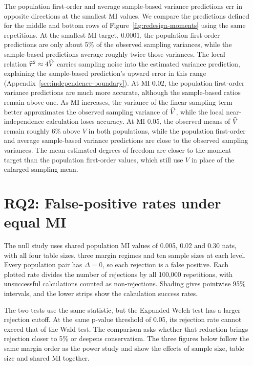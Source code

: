 The population first-order and average sample-based variance predictions
err in opposite directions at the smallest MI values. We compare the
predictions defined for the middle and bottom rows of
Figure~\ref{fig:redesign-moments} using the same repetitions. At the smallest MI target,
0.0001, the population first-order predictions are only about
5\% of the observed sampling variances, while the sample-based predictions
average roughly twice those variances. The local relation
\(\widehat\tau^2\approx4\widehat V\) carries sampling noise into the estimated
variance prediction, explaining the sample-based prediction's upward error
in this range
(Appendix~\ref{sec:independence-boundary}). At MI 0.02, the population
first-order variance predictions are much more accurate, although the
sample-based ratios remain above one. As MI increases, the variance of the
linear sampling term better approximates the observed sampling variance of
\(\widehat V\), while the local near-independence calculation loses accuracy.
At MI 0.05, the observed means of \(\widehat V\) remain roughly 6\% above \(V\)
in both populations, while the population first-order and average
sample-based variance predictions are close to the observed sampling
variances. The mean estimated degrees of
freedom are closer to the moment target than the population first-order
values, which still use \(V\) in place of the enlarged sampling mean.

\section{RQ2: False-positive rates under equal MI}
\label{sec:null-rejection-patterns}

The null study uses shared population MI values of 0.005, 0.02 and 0.30
nats, with all four table sizes, three margin regimes and ten sample
sizes at each level. Every population pair has \(\Delta=0\), so each
rejection is a false positive. Each plotted rate divides the number of
rejections by all 100,000 repetitions, with unsuccessful calculations
counted as non-rejections.
Shading gives pointwise 95\% intervals, and the lower strips show the
calculation success rates.

The two tests use the same statistic, but the Expanded Welch test has a larger
rejection cutoff. At the same p-value threshold of 0.05, its rejection rate
cannot exceed that of the Wald test. The comparison asks whether that
reduction brings rejection closer to 5\% or deepens conservatism. The
three figures below follow the same margin order as the power study and
show the effects of sample size, table size and shared MI together.

